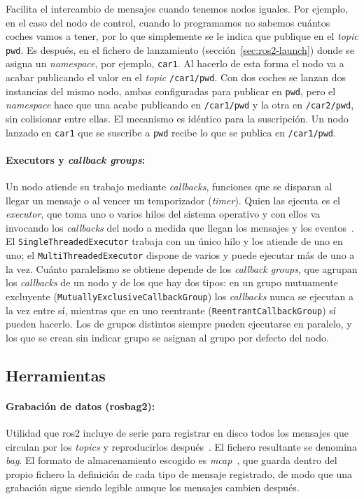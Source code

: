 Facilita el intercambio de mensajes cuando tenemos nodos iguales. Por ejemplo, en el caso del nodo de control, cuando lo programamos no sabemos cuántos coches vamos a tener, por lo que simplemente se le indica que publique en el \emph{topic} \texttt{pwd}. Es después, en el fichero de lanzamiento (sección~\ref{sec:ros2-launch}) donde se asigna un \emph{namespace}, por ejemplo, \texttt{car1}. Al hacerlo de esta forma el nodo va a acabar publicando el valor en el \emph{topic} \texttt{/car1/pwd}. Con dos coches se lanzan dos instancias del mismo nodo, ambas configuradas para publicar en \texttt{pwd}, pero el \emph{namespace} hace que una acabe publicando en \texttt{/car1/pwd} y la otra en \texttt{/car2/pwd}, sin colisionar entre ellas. El mecanismo es idéntico para la suscripción. Un nodo lanzado en \texttt{car1} que se suscribe a \texttt{pwd} recibe lo que se publica en \texttt{/car1/pwd}.

\paragraph{Executors y \emph{callback groups}:}
\label{sec:ros2-executors}
Un nodo atiende su trabajo mediante \emph{callbacks}, funciones que se disparan al llegar un mensaje o al vencer un temporizador (\emph{timer}). Quien las ejecuta es el \emph{executor}, que toma uno o varios hilos del sistema operativo y con ellos va invocando los \emph{callbacks} del nodo a medida que llegan los mensajes y los eventos~\cite{ros2executors}. El \texttt{SingleThreadedExecutor} trabaja con un único hilo y los atiende de uno en uno; el \texttt{MultiThreadedExecutor} dispone de varios y puede ejecutar más de uno a la vez. Cuánto paralelismo se obtiene depende de los \emph{callback groups}, que agrupan los \emph{callbacks} de un nodo y de los que hay dos tipos: en un grupo mutuamente excluyente (\texttt{MutuallyExclusiveCallbackGroup}) los \emph{callbacks} nunca se ejecutan a la vez entre sí, mientras que en uno reentrante (\texttt{ReentrantCallbackGroup}) sí pueden hacerlo. Los de grupos distintos siempre pueden ejecutarse en paralelo, y los que se crean sin indicar grupo se asignan al grupo por defecto del nodo.

\subsection{Herramientas}
\paragraph{Grabación de datos (rosbag2):}
\label{sec:ros2-rosbag}
Utilidad que \gls{ros2} incluye de serie para registrar en disco todos los mensajes que circulan por los \textit{topics} y reproducirlos después~\cite{rosbag2}. El fichero resultante se denomina \textit{bag}. El formato de almacenamiento escogido es \emph{mcap}~\cite{mcap}, que guarda dentro del propio fichero la definición de cada tipo de mensaje registrado, de modo que una grabación sigue siendo legible aunque los mensajes cambien después.


